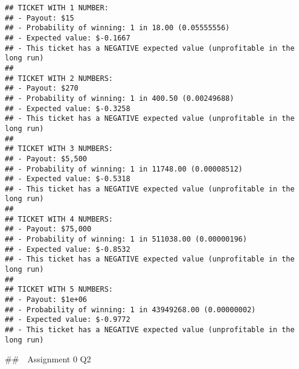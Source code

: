 \documentclass[
]{article}
\newenvironment{Shaded}{\begin{snugshade}}{\end{snugshade}}
\newcommand{\CommentTok}[1]{\textcolor[rgb]{0.56,0.35,0.01}{\textit{#1}}}
\newcommand{\DecValTok}[1]{\textcolor[rgb]{0.00,0.00,0.81}{#1}}
\newcommand{\FunctionTok}[1]{\textcolor[rgb]{0.13,0.29,0.53}{\textbf{#1}}}
\newcommand{\NormalTok}[1]{#1}
\newcommand{\OtherTok}[1]{\textcolor[rgb]{0.56,0.35,0.01}{#1}}
\newcommand{\SpecialCharTok}[1]{\textcolor[rgb]{0.81,0.36,0.00}{\textbf{#1}}}
\newcommand{\StringTok}[1]{\textcolor[rgb]{0.31,0.60,0.02}{#1}}
\begin{document}
\begin{verbatim}
## TICKET WITH 1 NUMBER:
## - Payout: $15
## - Probability of winning: 1 in 18.00 (0.05555556)
## - Expected value: $-0.1667
## - This ticket has a NEGATIVE expected value (unprofitable in the long run)
## 
## TICKET WITH 2 NUMBERS:
## - Payout: $270
## - Probability of winning: 1 in 400.50 (0.00249688)
## - Expected value: $-0.3258
## - This ticket has a NEGATIVE expected value (unprofitable in the long run)
## 
## TICKET WITH 3 NUMBERS:
## - Payout: $5,500
## - Probability of winning: 1 in 11748.00 (0.00008512)
## - Expected value: $-0.5318
## - This ticket has a NEGATIVE expected value (unprofitable in the long run)
## 
## TICKET WITH 4 NUMBERS:
## - Payout: $75,000
## - Probability of winning: 1 in 511038.00 (0.00000196)
## - Expected value: $-0.8532
## - This ticket has a NEGATIVE expected value (unprofitable in the long run)
## 
## TICKET WITH 5 NUMBERS:
## - Payout: $1e+06
## - Probability of winning: 1 in 43949268.00 (0.00000002)
## - Expected value: $-0.9772
## - This ticket has a NEGATIVE expected value (unprofitable in the long run)
\end{verbatim}

\#\#　Assignment 0 Q2

\begin{Shaded}
\end{Shaded}
\end{document}
